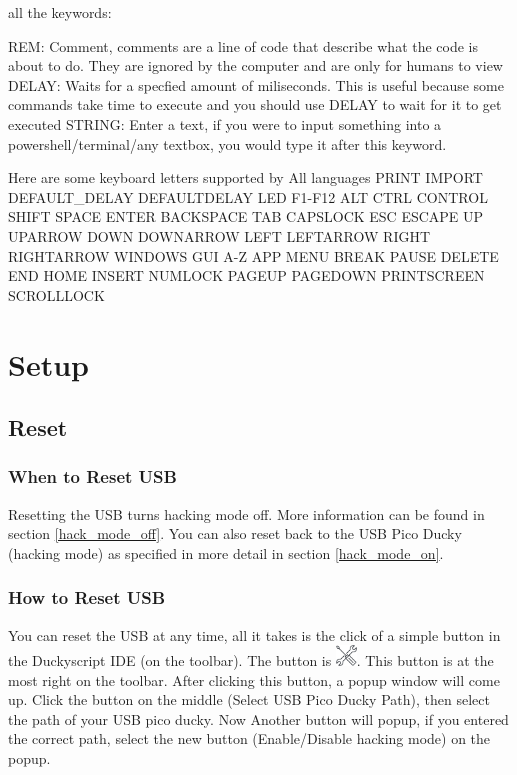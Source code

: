 \documentclass[a4paper,12pt]{article}
\begin{document}
all the keywords:

REM: Comment, comments are a line of code that describe what the code is about to do. They are ignored by the computer and are only for humans to view
DELAY: Waits for a specfied amount of miliseconds. This is useful because some commands take time to execute and you should use DELAY to wait for it to get executed
STRING: Enter a text, if you were to input something into a powershell/terminal/any textbox, you would type it after this keyword.

Here are some keyboard letters supported by All languages
PRINT
IMPORT
DEFAULT\_DELAY
DEFAULTDELAY
LED
F1-F12
ALT
CTRL
CONTROL
SHIFT
SPACE
ENTER
BACKSPACE
TAB
CAPSLOCK
ESC
ESCAPE
UP
UPARROW
DOWN
DOWNARROW
LEFT
LEFTARROW
RIGHT
RIGHTARROW
WINDOWS
GUI
A-Z
APP
MENU
BREAK
PAUSE
DELETE
END
HOME
INSERT
NUMLOCK
PAGEUP
PAGEDOWN
PRINTSCREEN
SCROLLLOCK

\section{Setup}

\subsection{Reset}

\subsubsection{When to Reset USB}

Resetting the USB turns hacking mode off. More information can be found in section \ref{hack_mode_off}. You can also reset back to the USB Pico Ducky (hacking mode) as specified in more detail in section \ref{hack_mode_on}.

\subsubsection{How to Reset USB}\label{how_to_reset}

You can reset the USB at any time, all it takes is the click of a simple button in the Duckyscript IDE (on the toolbar). The button is \includegraphics[width=5.5mm]{pictures/setup.png}. This button is at the most right on the toolbar. After clicking this button, a popup window will come up. Click the button on the middle (Select USB Pico Ducky Path), then select the path of your USB pico ducky. Now Another button will popup, if you entered the correct path, select the new button (Enable/Disable hacking mode) on the popup.
\end{document}
